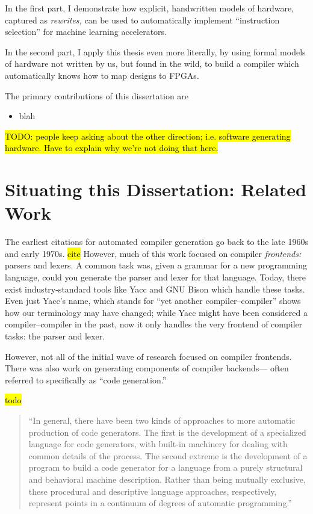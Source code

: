 In the first part,
  I demonstrate
  how explicit,
  handwritten
  models of hardware,
  captured as
  \textit{rewrites,}
  can be used 
  to automatically implement
  ``instruction selection''
  for machine learning
  accelerators.

In the second part,
  I apply this thesis
  even more literally, by using
  formal models of hardware
  not written by us,
  but found in the wild,
  to build a compiler
  which automatically knows
  how to map designs
  to FPGAs.

The primary contributions of this dissertation
  are
\begin{itemize}

    \item blah
\end{itemize}


\hl{
TODO: people keep asking about the other direction;
  i.e. software generating hardware.
Have to explain why we're not doing that here.
}
  

\section{Situating this Dissertation: Related Work}

The earliest citations
  for automated compiler generation
  go back to the late 1960s and early 1970s.
  \hl{cite}
However, much of this work focused on
  compiler \textit{frontends:}
  parsers and lexers.
A common task was,
  given a grammar for a new programming language,
  could you generate the parser and lexer
  for that language.
Today, there exist industry-standard tools
  like Yacc and GNU Bison
  which handle these tasks.
Even just Yacc's name, which stands for
  ``yet another compiler--compiler''
  shows how our terminology may have changed;
  while Yacc might have been considered
  a compiler--compiler in the past,
  now it only handles the very frontend
  of compiler tasks: the parser and lexer.

However, not all of the initial wave of research
  focused on compiler frontends.
There was also work on generating components
  of compiler backends---%
  often referred to specifically as 
  ``code generation.''
  
  


\hl{todo}

\begin{quote}
``In general, there have been two kinds of approaches to more automatic production of
code generators. The first is the development of a specialized language for code
generators, with built-in machinery for dealing with common details of the process.
The second extreme is the development of a program to build a code generator for a
language from a purely structural and behavioral machine description. Rather than
being mutually exclusive, these procedural and descriptive language approaches,
respectively, represent points in a continuum of degrees of automatic programming.''
\end{quote}


